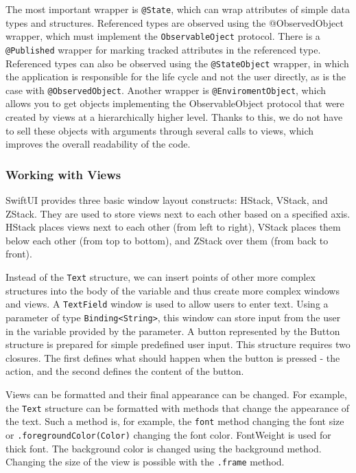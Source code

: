 \documentclass[
  language=english,
  figures=false,
  sourcecodes,
  index
]{kidiplom}
\begin{document}
The most important wrapper is \texttt{@State}, which can wrap attributes of simple data types and structures. Referenced types are observed using the @ObservedObject wrapper, which must implement the \texttt{ObservableOject} protocol. There is a \texttt{@Published} wrapper for marking tracked attributes in the referenced type. Referenced types can also be observed using the \texttt{@StateObject} wrapper, in which the application is responsible for the life cycle and not the user directly, as is the case with \texttt{@ObservedObject}. Another wrapper is \texttt{@EnviromentObject}, which allows you to get objects implementing the ObservableObject protocol that were created by views at a hierarchically higher level. Thanks to this, we do not have to sell these objects with arguments through several calls to views, which improves the overall readability of the code.

\subsubsection{Working with Views}
SwiftUI provides three basic window layout constructs: HStack, VStack, and ZStack. They are used to store views next to each other based on a specified axis. HStack places views next to each other (from left to right), VStack places them below each other (from top to bottom), and ZStack over them (from back to front).

Instead of the \texttt{Text} structure, we can insert points of other more complex structures into the body of the variable and thus create more complex windows and views. A \texttt{TextField} window is used to allow users to enter text. Using a parameter of type \texttt{Binding<String>}, this window can store input from the user in the variable provided by the parameter. A button represented by the Button structure is prepared for simple predefined user input. This structure requires two closures. The first defines what should happen when the button is pressed - the action, and the second defines the content of the button.

Views can be formatted and their final appearance can be changed. For example, the \texttt{Text} structure can be formatted with methods that change the appearance of the text. Such a method is, for example, the \texttt{font} method changing the font size or \texttt{.foregroundColor(Color)} changing the font color. FontWeight is used for thick font. The background color is changed using the background method. Changing the size of the view is possible with the \texttt{.frame} method.
\end{document}
